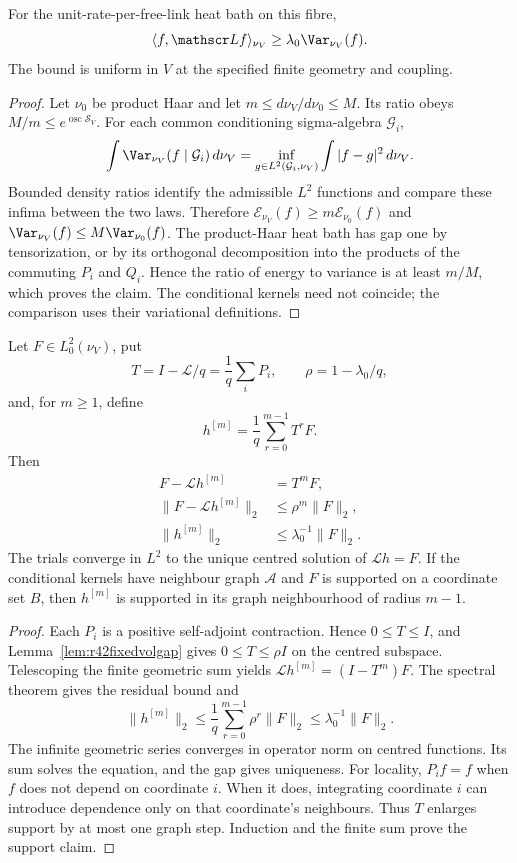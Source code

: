 \begin{lemma}\label{lem:r42fixedvolgap}
For the unit-rate-per-free-link heat bath on this fibre,
\[
 \langle f,\mathscr Lf\rangle_{\nu_V}
                         \ge\lambda_0\Var_{\nu_V}(f).
\]
The bound is uniform in $V$ at the specified finite geometry and
coupling.
\end{lemma}
\begin{proof}
Let $\nu_0$ be product Haar and let
$m\le d\nu_V/d\nu_0\le M$. Its ratio obeys
$M/m\le e^{\operatorname{osc}\mathcal S_V}$.
For each common conditioning sigma-algebra $\mathcal G_i$,
\[
 \int\Var_{\nu_V}(f\mid\mathcal G_i)\,d\nu_V
   =\inf_{g\in L^2(\mathcal G_i,\nu_V)}\int|f-g|^2\,d\nu_V.
\]
Bounded density ratios identify the admissible $L^2$ functions and
compare these infima between the two laws. Therefore
$\mathcal E_{\nu_V}(f)\ge m\mathcal E_{\nu_0}(f)$ and
$\Var_{\nu_V}(f)\le M\Var_{\nu_0}(f)$.
The product-Haar heat bath has gap one by tensorization, or by its
orthogonal decomposition into the products of the commuting $P_i$ and
$Q_i$. Hence the ratio of energy to variance is at least $m/M$,
which proves the claim. The conditional kernels need not coincide;
the comparison uses their variational definitions.
\end{proof}

\begin{theorem}
\label{thm:r42neumann}
Let $F\in L^2_0(\nu_V)$, put
\[
 T=I-\mathscr L/q=\frac1q\sum_iP_i,\qquad
 \rho=1-\lambda_0/q,
\]
and, for $m\ge1$, define
\begin{equation}\label{eq:r42trial}
 h^{[m]}=\frac1q\sum_{r=0}^{m-1}T^rF.
\end{equation}
Then
\begin{align}
 F-\mathscr Lh^{[m]}&=T^mF,\nonumber\\
 \|F-\mathscr Lh^{[m]}\|_2&\le\rho^m\|F\|_2,
 \label{eq:r42residualrate}\\
 \|h^{[m]}\|_2&\le\lambda_0^{-1}\|F\|_2.\nonumber
\end{align}
The trials converge in $L^2$ to the unique centred solution of
$\mathscr Lh=F$. If the conditional kernels have neighbour graph
$\mathcal A$ and $F$ is supported on a coordinate set $B$, then
$h^{[m]}$ is supported in its graph neighbourhood of radius $m-1$.
\end{theorem}
\begin{proof}
Each $P_i$ is a positive self-adjoint contraction. Hence
$0\le T\le I$, and Lemma~\ref{lem:r42fixedvolgap} gives
$0\le T\le\rho I$ on the centred subspace. Telescoping the finite
geometric sum yields
$\mathscr Lh^{[m]}=(I-T^m)F$. The spectral theorem gives the residual
bound and
\[
 \|h^{[m]}\|_2\le\frac1q\sum_{r=0}^{m-1}\rho^r\|F\|_2
                         \le\lambda_0^{-1}\|F\|_2.
\]
The infinite geometric series converges in operator norm on centred
functions. Its sum solves the equation, and the gap gives uniqueness.
For locality, $P_if=f$ when $f$ does not depend on coordinate $i$.
When it does, integrating coordinate $i$ can introduce dependence only
on that coordinate's neighbours. Thus $T$ enlarges support by at most
one graph step. Induction and the finite sum prove the support claim.
\end{proof}

